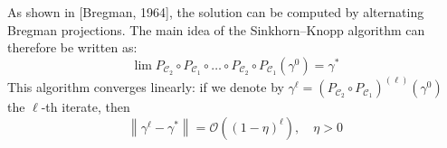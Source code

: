 \documentclass[landscape,a0paper,fontscale=0.35]{baposter} %
\theoremstyle{plain}
\theoremstyle{plain}
\theoremstyle{plain}
\theoremstyle{plain}
\DeclareMathOperator{\Ccal}{\mathcal{C}}
\newcommand{\norm}[1]{\left\lVert #1 \right\rVert}
\begin{document}
\begin{poster}
{	As shown in [Bregman, 1964], the solution can be computed by alternating Bregman projections. The main idea of the Sinkhorn--Knopp algorithm can therefore be written as:
	\begin{equation}
	\lim P_{\Ccal_2}\circ P_{\Ccal_1} \circ \ldots \circ P_{\Ccal_2} \circ P_{\Ccal_1} (\gamma^0) = \gamma^*
	\end{equation}
	This algorithm converges linearly: if we denote by $\gamma^\ell = (P_{\Ccal_2} \circ P_{\Ccal_1})^{(\ell)}(\gamma^0)$ the $\ell$-th iterate, then
	\[ \norm{\gamma^\ell - \gamma^*} = \mathcal{O}\left((1-\eta)^\ell \right) , \quad \eta > 0 \]
}



\end{poster}
\end{document}
